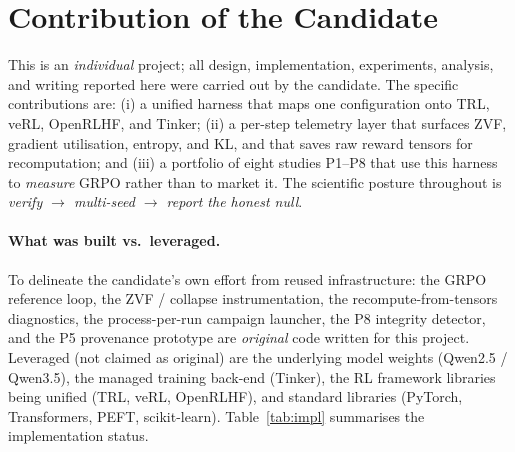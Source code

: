\documentclass[12pt,a4paper]{report}
\begin{document}
\section{Contribution of the Candidate}
\label{sec:contribution}
This is an \emph{individual} project; all design, implementation, experiments, analysis,
and writing reported here were carried out by the candidate. The specific contributions
are: (i) a unified harness that maps one configuration onto TRL, veRL, OpenRLHF, and
Tinker; (ii) a per-step telemetry layer that surfaces ZVF, gradient utilisation,
entropy, and KL, and that saves raw reward tensors for recomputation; and (iii) a
portfolio of eight studies P1--P8 that use this harness to \emph{measure} GRPO rather
than to market it. The scientific posture throughout is
\emph{verify $\rightarrow$ multi-seed $\rightarrow$ report the honest null}.

\paragraph{What was built vs.\ leveraged.} To delineate the candidate's own effort from
reused infrastructure: the GRPO reference loop, the ZVF / collapse instrumentation, the
recompute-from-tensors diagnostics, the process-per-run campaign launcher, the P8
integrity detector, and the P5 provenance prototype are \emph{original} code written for
this project. Leveraged (not claimed as original) are the underlying model weights
(Qwen2.5 / Qwen3.5), the managed training back-end (Tinker), the RL framework libraries
being unified (TRL, veRL, OpenRLHF), and standard libraries (PyTorch, Transformers,
PEFT, scikit-learn). Table~\ref{tab:impl} summarises the implementation status.
\end{document}

